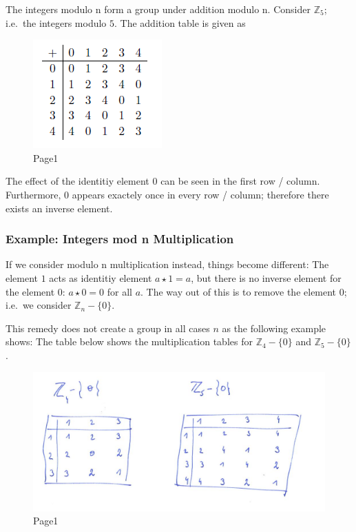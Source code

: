 The integers modulo n form a group under addition modulo n. Consider
\(\mathbb{Z}_5\); i.e.~the integers modulo \(5\). The addition table is
given as

\begin{figure}
\centering
\includegraphics{images/groups_01_1.png}
\caption{Page1}
\end{figure}

The effect of the identitiy element \(0\) can be seen in the first row /
column. Furthermore, \(0\) appears exactely once in every row / column;
therefore there exists an inverse element.

\subsubsection{Example: Integers mod n
Multiplication}\label{example-integers-mod-n-multiplication}

If we consider modulo n multiplication instead, things become different:
The element \(1\) acts as identitiy element \(a \star 1 = a\), but there
is no inverse element for the element \(0\): \(a \star 0 = 0\) for all
\(a\). The way out of this is to remove the element \(0\); i.e.~we
consider \(\mathbb{Z}_n - \{0\}\).

This remedy does not create a group in all cases \(n\) as the following
example shows: The table below shows the multiplication tables for
\(\mathbb{Z}_4 - \{0\}\) and \(\mathbb{Z}_5 - \{0\}\).

\begin{figure}
\centering
\includegraphics{images/groups_01_2.jpg}
\caption{Page1}
\end{figure}


